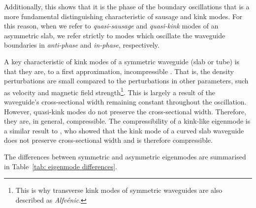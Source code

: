 Additionally, this shows that it is the phase of the boundary oscillations that is a more fundamental distinguishing characteristic of sausage and kink modes. For this reason, when we refer to \textit{quasi-sausage} and \textit{quasi-kink} modes of an asymmetric slab, we refer strictly to modes which oscillate the waveguide boundaries in \textit{anti-phase} and \textit{in-phase}, respectively.

A key characteristic of kink modes of a symmetric waveguide (slab or tube) is that they are, to a first approximation, incompressible \citep{goo_etal09}. That is, the density perturbations are small compared to the perturbations in other parameters, such as velocity and magnetic field strength\footnote{This is why transverse kink modes of symmetric waveguides are also described as \textit{Alfv\'{e}nic}.}. This is largely a result of the waveguide's cross-sectional width remaining constant throughout the oscillation. However, quasi-kink modes do not preserve the cross-sectional width. Therefore, they are, in general, compressible. The compressibility of a kink-like eigenmode is a similar result to \cite{ver_etal06a}, who showed that the kink mode of a curved slab waveguide does not preserve cross-sectional width and is therefore compressible.

The differences between symmetric and asymmetric eigenmodes are summarised in Table~\ref{tab: eigenmode differences}.

